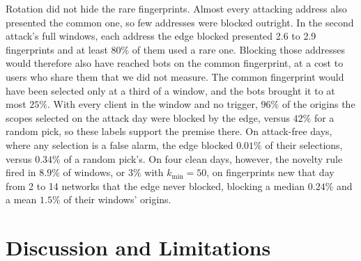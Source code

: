 \documentclass[conference,letterpaper,10pt]{IEEEtran}
\newcommand\1{\textit{(i)}}
\newcommand\2{\textit{(ii)}}
\newcommand\3{\textit{(iii)}}
\newcommand\4{\textit{(iv)}}
\newcommand\5{\textit{(v)}}
\newcommand\6{\textit{(vi)}}
\newcommand\7{\textit{(vii)}}
\newcommand\8{\textit{(viii)}}
\newcommand\9{\textit{(ix)}}
\begin{document}
Rotation did not hide the rare fingerprints. Almost every attacking address also presented the common one, so few addresses were blocked outright. In the second attack's full windows, each address the edge blocked presented 2.6 to 2.9 fingerprints and at least $80\%$ of them used a rare one. Blocking those addresses would therefore also have reached bots on the common fingerprint, at a cost to users who share them that we did not measure. The common fingerprint would have been selected only at a third of a window, and the bots brought it to at most $25\%$. With every client in the window and no trigger, $96\%$ of the origins the scopes selected on the attack day were blocked by the edge, versus $42\%$ for a random pick, so these labels support the premise there. On attack-free days, where any selection is a false alarm, the edge blocked $0.01\%$ of their selections, versus $0.34\%$ of a random pick's. On four clean days, however, the novelty rule fired in $8.9\%$ of windows, or $3\%$ with $k_{\min} = 50$, on fingerprints new that day from 2 to 14 networks that the edge never blocked, blocking a median $0.24\%$ and a mean $1.5\%$ of their windows' origins.

\section{Discussion and Limitations}
\label{sec:discussion}
\end{document}
